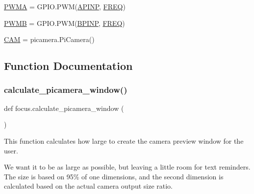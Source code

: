 \begin{DoxyCompactItemize}
\item 
\hyperlink{namespacefocus_a2418021a7b6b394da695928f0d8cd16b}{P\+W\+MA} = G\+P\+I\+O.\+P\+WM(\hyperlink{namespacefocus_a358eaeffe0790a67619dfd820f2d66b5}{A\+P\+I\+NP}, \hyperlink{namespacefocus_a9f8a2660e7de2a492738e587878c2b7a}{F\+R\+EQ})
\item 
\hyperlink{namespacefocus_a9e16a63e33dd8dd160996df16dacb633}{P\+W\+MB} = G\+P\+I\+O.\+P\+WM(\hyperlink{namespacefocus_a88336729338c9d4ef54e14f02f406c1b}{B\+P\+I\+NP}, \hyperlink{namespacefocus_a9f8a2660e7de2a492738e587878c2b7a}{F\+R\+EQ})
\item 
\hyperlink{namespacefocus_a2c64f595bbe297e961b55c735e7023c5}{C\+AM} = picamera.\+Pi\+Camera()
\end{DoxyCompactItemize}


\subsection{Function Documentation}
\mbox{\label{namespacefocus_ace593fb72d9a91bc93d3a25614a365d0}} 
\subsubsection{\texorpdfstring{calculate\+\_\+picamera\+\_\+window()}{calculate\_picamera\_window()}}
{\footnotesize\ttfamily def focus.\+calculate\+\_\+picamera\+\_\+window (\begin{DoxyParamCaption}{ }\end{DoxyParamCaption})}



This function calculates how large to create the camera preview window for the user. 

We want it to be as large as possible, but leaving a little room for text reminders. The size is based on 95\% of one dimensions, and the second dimension is calculated based on the actual camera output size ratio.

